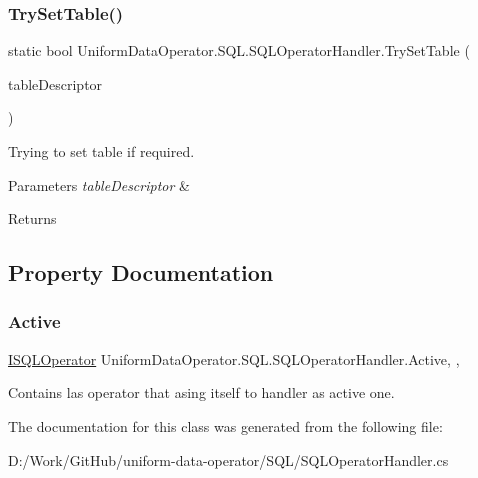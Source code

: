 \subsubsection{\texorpdfstring{Try\+Set\+Table()}{TrySetTable()}}
{\footnotesize\ttfamily static bool Uniform\+Data\+Operator.\+S\+Q\+L.\+S\+Q\+L\+Operator\+Handler.\+Try\+Set\+Table (\begin{DoxyParamCaption}\item[{\mbox{\hyperlink{interface_uniform_data_operator_1_1_s_q_l_1_1_tables_1_1_i_s_q_l_table}{Tables.\+I\+S\+Q\+L\+Table}}}]{table\+Descriptor }\end{DoxyParamCaption})\hspace{0.3cm}{\ttfamily [static]}}



Trying to set table if required. 


\begin{DoxyParams}{Parameters}
{\em table\+Descriptor} & \\
\hline
\end{DoxyParams}
\begin{DoxyReturn}{Returns}

\end{DoxyReturn}


\subsection{Property Documentation}
\mbox{\label{class_uniform_data_operator_1_1_s_q_l_1_1_s_q_l_operator_handler_a0352c7146abccf0b231bf8bd83cd40c0}} 
\subsubsection{\texorpdfstring{Active}{Active}}
{\footnotesize\ttfamily \mbox{\hyperlink{interface_uniform_data_operator_1_1_s_q_l_1_1_i_s_q_l_operator}{I\+S\+Q\+L\+Operator}} Uniform\+Data\+Operator.\+S\+Q\+L.\+S\+Q\+L\+Operator\+Handler.\+Active\hspace{0.3cm}{\ttfamily [static]}, {\ttfamily [get]}, {\ttfamily [set]}}



Contains las operator that asing itself to handler as active one. 



The documentation for this class was generated from the following file\+:\begin{DoxyCompactItemize}
\item 
D\+:/\+Work/\+Git\+Hub/uniform-\/data-\/operator/\+S\+Q\+L/S\+Q\+L\+Operator\+Handler.\+cs\end{DoxyCompactItemize}
